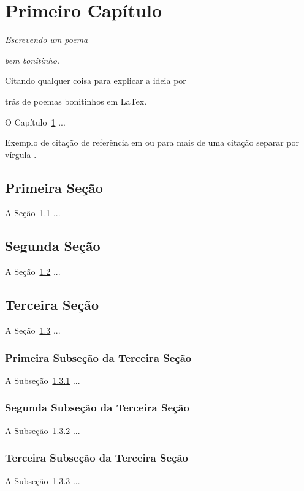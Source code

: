\chapter{Primeiro Capítulo}
\label{cap:primeiro} 		%

\begin{flushright}	%
	\small
	\textit{Escrevendo um poema}
	
	\vspace{-3mm}
	\textit{bem bonitinho.}
		
	\vspace{-3mm} Citando qualquer coisa para explicar a ideia por
	
	\vspace{-3mm} trás de poemas bonitinhos em LaTex.
\end{flushright}

O Capítulo~\ref{cap:primeiro} ...

Exemplo de citação de referência em \cite{COLHERINHAS20171623} ou para mais de uma citação separar por vírgula \cite{alvaro2017,alvaro2015}.

\section{Primeira Seção}
\label{sec:primeiro_1}

A Seção~\ref{sec:primeiro_1} ...

\section{Segunda Seção}
\label{sec:primeiro_2}

A Seção~\ref{sec:primeiro_2} ...

\section{Terceira Seção}
\label{sec:primeiro_3}

A Seção~\ref{sec:primeiro_3} ...

\subsection{Primeira Subseção da Terceira Seção}
\label{subsec:primeiro_3.1}

A Subseção~\ref{subsec:primeiro_3.1} ...

\subsection{Segunda Subseção da Terceira Seção}
\label{subsec:primeiro_3.2}

A Subseção~\ref{subsec:primeiro_3.2} ...

\subsection{Terceira Subseção da Terceira Seção}
\label{subsec:primeiro_3.3}

A Subseção~\ref{subsec:primeiro_3.3} ...
